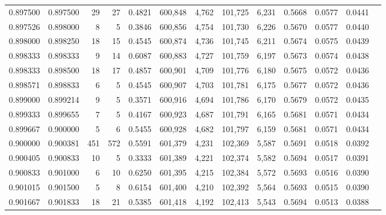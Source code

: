 \begin{tabular}{rrrrrrrrrrrrr}
0.897500 & 0.897500 &    29 &  27 &                                     0.4821 & 600,848 &   4,762 & 101,725 &   6,231 & 0.5668 & 0.0577 & 0.0441 \\
0.897526 & 0.898000 &     8 &   5 &                                     0.3846 & 600,856 &   4,754 & 101,730 &   6,226 & 0.5670 & 0.0577 & 0.0440 \\
0.898000 & 0.898250 &    18 &  15 &                                     0.4545 & 600,874 &   4,736 & 101,745 &   6,211 & 0.5674 & 0.0575 & 0.0439 \\
0.898333 & 0.898333 &     9 &  14 &                                     0.6087 & 600,883 &   4,727 & 101,759 &   6,197 & 0.5673 & 0.0574 & 0.0438 \\
0.898333 & 0.898500 &    18 &  17 &                                     0.4857 & 600,901 &   4,709 & 101,776 &   6,180 & 0.5675 & 0.0572 & 0.0436 \\
0.898571 & 0.898833 &     6 &   5 &                                     0.4545 & 600,907 &   4,703 & 101,781 &   6,175 & 0.5677 & 0.0572 & 0.0436 \\
0.899000 & 0.899214 &     9 &   5 &                                     0.3571 & 600,916 &   4,694 & 101,786 &   6,170 & 0.5679 & 0.0572 & 0.0435 \\
0.899333 & 0.899655 &     7 &   5 &                                     0.4167 & 600,923 &   4,687 & 101,791 &   6,165 & 0.5681 & 0.0571 & 0.0434 \\
0.899667 & 0.900000 &     5 &   6 &                                     0.5455 & 600,928 &   4,682 & 101,797 &   6,159 & 0.5681 & 0.0571 & 0.0434 \\
0.900000 & 0.900381 &   451 & 572 &                                     0.5591 & 601,379 &   4,231 & 102,369 &   5,587 & 0.5691 & 0.0518 & 0.0392 \\
0.900405 & 0.900833 &    10 &   5 &                                     0.3333 & 601,389 &   4,221 & 102,374 &   5,582 & 0.5694 & 0.0517 & 0.0391 \\
0.900833 & 0.901000 &     6 &  10 &                                     0.6250 & 601,395 &   4,215 & 102,384 &   5,572 & 0.5693 & 0.0516 & 0.0390 \\
0.901015 & 0.901500 &     5 &   8 &                                     0.6154 & 601,400 &   4,210 & 102,392 &   5,564 & 0.5693 & 0.0515 & 0.0390 \\
0.901667 & 0.901833 &    18 &  21 &                                     0.5385 & 601,418 &   4,192 & 102,413 &   5,543 & 0.5694 & 0.0513 & 0.0388 \\

\end{tabular}
